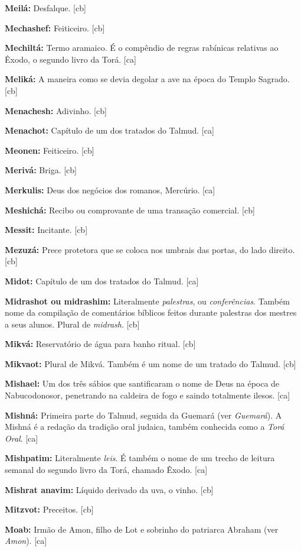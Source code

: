 \textbf{Meilá:} Desfalque. [cb]

\textbf{Mechashef:} Feiticeiro. [cb]

\textbf{Mechiltá:} Termo aramaico. É o compêndio de regras rabínicas relativas ao Êxodo, o
segundo livro da Torá. [ca]

\textbf{Meliká:} A maneira como se devia degolar a ave na época do Templo Sagrado. [cb]

\textbf{Menachesh:} Adivinho. [cb]

\textbf{Menachot:} Capítulo de um dos tratados do Talmud. [ca]

\textbf{Meonen:} Feiticeiro. [cb]

\textbf{Merivá:} Briga. [cb]

\textbf{Merkulis:} Deus dos negócios dos romanos, Mercúrio. [ca]

\textbf{Meshichá:} Recibo ou comprovante de uma transação comercial. [cb]

\textbf{Messit:} Incitante. [cb]

\textbf{Mezuzá:} Prece protetora que se coloca nos umbrais das portas,
do lado direito. [cb]

\textbf{Midot:} Capítulo de um dos tratados do Talmud. [ca]

\textbf{Midrashot ou midrashim:} Literalmente \emph{palestras}, ou 
\emph{conferências}. 
Também nome da compilação de comentários bíblicos feitos
durante palestras dos mestres a seus alunos. Plural de \emph{midrash}. [cb]

\textbf{Mikvá:} Reservatório de água para banho ritual. [cb]

\textbf{Mikvaot:} Plural de Mikvá. Também é um nome de um tratado do Talmud. [cb]

\textbf{Mishael:} Um dos três sábios que santificaram o nome de Deus na
época de Nabucodonosor, penetrando na caldeira de fogo e saindo
totalmente ilesos. [ca]

\textbf{Mishná:} Primeira parte do Talmud, seguida da Guemará 
(ver \emph{Guemará}). A Mishná
é a redação da tradição oral judaica, também conhecida como a \emph{Torá Oral}. [ca]

\textbf{Mishpatim:} Literalmente \emph{leis}. É também o nome de um trecho de 
leitura semanal do segundo livro da Torá, chamado Êxodo. [ca]

\textbf{Mishrat anavim:} Líquido derivado da uva, o vinho. [cb]

\textbf{Mitzvot:} Preceitos. [cb]

\textbf{Moab:} Irmão de Amon, filho de Lot e sobrinho do patriarca
Abraham (ver \emph{Amon}). [ca]

